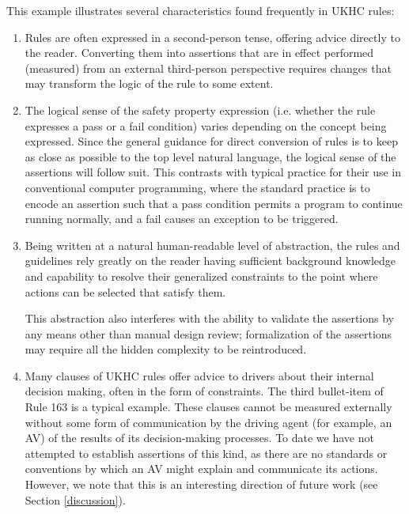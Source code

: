 This example illustrates several characteristics found frequently in UKHC rules:
\begin{enumerate}
    \item Rules are often expressed in a second-person tense, offering advice directly to the reader. Converting them into assertions that are in effect performed (measured) from an external third-person perspective requires changes that may transform the logic of the rule to some extent.
    
    \item The logical sense of the safety property expression (i.e. whether the rule expresses a pass or a fail condition) varies depending on the concept being expressed. Since the general guidance for direct conversion of rules is to keep as close as possible to the top level natural language, the logical sense of the assertions will follow suit. This contrasts with typical practice for their use in conventional computer programming, where the standard practice is to encode an assertion such that a pass condition permits a program to continue running normally, and a fail causes an exception to be triggered.
    
    \item Being written at a natural human-readable level of abstraction, the rules and guidelines rely greatly on the reader having sufficient background knowledge and capability to resolve their generalized constraints to the point where actions can be selected that satisfy them.
    
    This abstraction also interferes with the ability to validate the assertions by any means other than manual design review; formalization of the assertions may require all the hidden complexity to be reintroduced.
    
    \item Many clauses of UKHC rules offer advice to drivers about their internal decision making, often in the form of constraints. The third bullet-item of Rule 163 is a typical example. These clauses cannot be measured externally without some form of communication by the driving agent (for example, an AV) of the results of its decision-making processes. To date we have not attempted to establish assertions of this kind, as there are no standards or conventions by which an AV might explain and communicate its actions. However, we note that this is an interesting direction of future work (see Section \ref{discussion}). 
\end{enumerate}

